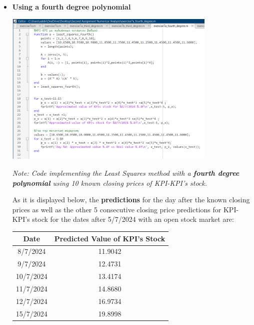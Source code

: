 \documentclass{article}
\begin{document}
\begin{itemize}
\begin{center}
    \end{center}
    \item \textbf{Using a fourth degree polynomial}
    \begin{tcolorbox}[colback=red!10, colframe=gray!80, width=\textwidth, sharp corners]
    \centering 
    \includegraphics[width=0.8\textwidth,height=0.38\textheight]{Exercise7aFourth.png} 

    \vspace{0.1cm}
    \small\textit{Note: Code implementing the Least Squares method with a \textbf{fourth degree polynomial} using 10 known closing prices of KPI-KPI's stock. }
\end{tcolorbox}


As it is displayed below, the \textbf{predictions} for the day after the known closing prices as well as the other 5 consecutive closing price predictions for KPI-KPI's stock for the dates after 5/7/2024 with an open stock market are:

\begin{center}
    \begin{tabular}{|c|c|}
        \hline
        \textbf{Date} & \textbf{Predicted Value of KPI's Stock} \\
        \hline
        8/7/2024 & 11.9042 \\
        9/7/2024 & 12.4731 \\
        10/7/2024 & 13.4174 \\
        11/7/2024 & 14.8680 \\
        12/7/2024 & 16.9734 \\
        15/7/2024 & 19.8998 \\
        \hline
    \end{tabular}
\end{center}


\end{itemize}
\end{document}
